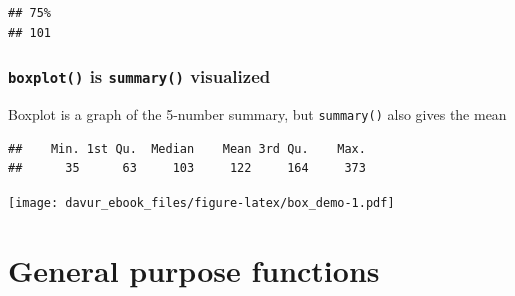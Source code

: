 \documentclass[]{book}
\newenvironment{Shaded}{\begin{snugshade}}{\end{snugshade}}
\newcommand{\CommentTok}[1]{\textcolor[rgb]{0.56,0.35,0.01}{\textit{#1}}}
\newcommand{\DataTypeTok}[1]{\textcolor[rgb]{0.13,0.29,0.53}{#1}}
\newcommand{\FloatTok}[1]{\textcolor[rgb]{0.00,0.00,0.81}{#1}}
\newcommand{\KeywordTok}[1]{\textcolor[rgb]{0.13,0.29,0.53}{\textbf{#1}}}
\newcommand{\NormalTok}[1]{#1}
\newcommand{\OperatorTok}[1]{\textcolor[rgb]{0.81,0.36,0.00}{\textbf{#1}}}
\begin{document}
\begin{Shaded}
\end{Shaded}

\begin{verbatim}
## 75% 
## 101
\end{verbatim}

\hypertarget{boxplot-is-summary-visualized}{%
\subsubsection*{\texorpdfstring{\texttt{boxplot()} is \texttt{summary()} visualized}{boxplot() is summary() visualized}}\label{boxplot-is-summary-visualized}}

Boxplot is a graph of the 5-number summary, but \texttt{summary()} also gives the mean

\begin{Shaded}
\end{Shaded}

\begin{verbatim}
##    Min. 1st Qu.  Median    Mean 3rd Qu.    Max. 
##      35      63     103     122     164     373
\end{verbatim}

\begin{Shaded}
\end{Shaded}

\texttt{[image: davur\_ebook\_files/figure-latex/box\_demo-1.pdf]}

\hypertarget{general-purpose-functions}{%
\section{General purpose functions}\label{general-purpose-functions}}
\end{document}
